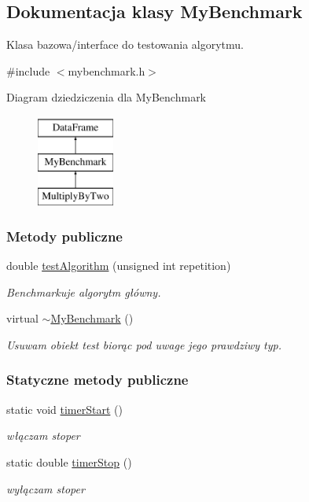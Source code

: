 \hypertarget{class_my_benchmark}{\subsection{Dokumentacja klasy My\-Benchmark}
\label{class_my_benchmark}
}


Klasa bazowa/interface do testowania algorytmu.  




{\ttfamily \#include $<$mybenchmark.\-h$>$}

Diagram dziedziczenia dla My\-Benchmark\begin{figure}[H]
\begin{center}
\leavevmode
\includegraphics[height=3.000000cm]{class_my_benchmark}
\end{center}
\end{figure}
\subsubsection*{Metody publiczne}
\begin{DoxyCompactItemize}
\item 
double \hyperlink{class_my_benchmark_a66576625ca37f8bc539c18ffceb69c9c}{test\-Algorithm} (unsigned int repetition)
\begin{DoxyCompactList}\small\item\em Benchmarkuje algorytm główny. \end{DoxyCompactList}\item 
virtual \hyperlink{class_my_benchmark_a00de82c40680b41065eb402ac90f1736}{$\sim$\-My\-Benchmark} ()
\begin{DoxyCompactList}\small\item\em Usuwam obiekt test biorąc pod uwage jego prawdziwy typ. \end{DoxyCompactList}\end{DoxyCompactItemize}
\subsubsection*{Statyczne metody publiczne}
\begin{DoxyCompactItemize}
\item 
static void \hyperlink{class_my_benchmark_a802577db97fd440a3920add30c35a676}{timer\-Start} ()
\begin{DoxyCompactList}\small\item\em włączam stoper \end{DoxyCompactList}\item 
static double \hyperlink{class_my_benchmark_a7e3fa28fab999435bd4c51d915e42809}{timer\-Stop} ()
\begin{DoxyCompactList}\small\item\em wyłączam stoper \end{DoxyCompactList}\end{DoxyCompactItemize}
